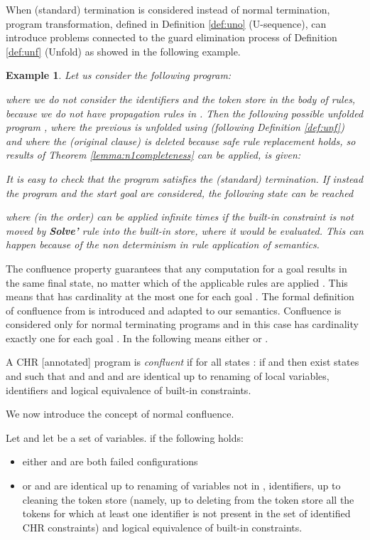 \documentclass[final]{acmtrans2e}
\newtheorem{exa}[theorem]{Example}
\newenvironment{example}{\begin{exa}}{\end{exa}}
\begin{document}
When (standard) termination is considered instead of normal termination, program
transformation, defined in Definition \ref{def:uno} (U-sequence), can introduce
problems connected to the guard elimination process of Definition \ref{def:unf}
(Unfold) as showed in the following example.

\begin{example}
Let us consider the following program:

where we do not consider the identifiers and the token store in the
body of rules, because we do not have propagation rules in .
Then the following possible unfolded program , where the previous
 is unfolded using  (following Definition \ref{def:unf}) and where the
(original clause)  is deleted because safe rule replacement holds, so results of Theorem
\ref{lemma:n1completeness} can be applied, is given:

It is easy to check that the program  satisfies the (standard) termination.
If instead the program  and the start goal  are
considered, the following state can be reached

where  (in the order) can be applied infinite times if the built-in constraint 
is not moved by \textbf{Solve'} rule into the built-in store, where it would be
evaluated. This can happen because of the non determinism in rule application of
 semantics.
\end{example}

The confluence property guarantees that any computation for a goal
results in the same final state, no matter which of the applicable
rules are applied \cite{AF04}. This means that  has
cardinality  at the most one for each goal .
The formal definition of confluence from \cite{Fru04}
is introduced and adapted to our  semantics.
Confluence is considered only for normal terminating programs and in this case  has
cardinality exactly one for each goal .
In the following  means either  or .


\begin{definition}[Confluence]
A CHR [annotated] program is \emph{confluent} if for all states
:
if  and  then exist states 
and  such that  and  and
 and  are identical up to renaming of local variables,
identifiers and logical equivalence of built-in constraints.
\end{definition}

We now introduce the concept of normal confluence.


\begin{definition}
Let
 and let  be a set of variables.  if the following holds:
\begin{itemize}
  \item either  and  are both failed configurations
  \item or  and  are identical up to renaming of variables not in ,
identifiers, up to cleaning the token store (namely, up to deleting from the token store all the tokens for
which at least one identifier is not present in the set of
identified CHR constraints) and logical equivalence of built-in constraints.
\end{itemize}
\end{definition}
\end{document}
